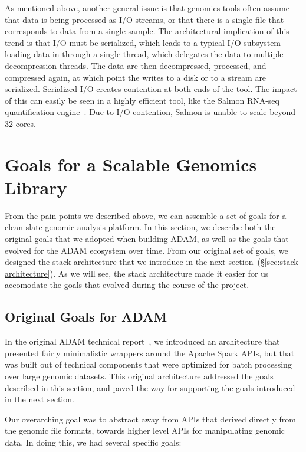 \documentclass[phd]{ucbthesis}
\begin{document}
As mentioned above, another general issue is that genomics tools often assume
that data is being processed as I/O streams, or that there is a single file that
corresponds to data from a single sample. The architectural implication of this
trend is that I/O must be serialized, which leads to a typical I/O subsystem
loading data in through a single thread, which delegates the data to multiple
decompression threads. The data are then decompressed, processed, and compressed
again, at which point the writes to a disk or to a stream are serialized.
Serialized I/O creates contention at both ends of the tool. The impact of this can easily be
seen in a highly efficient tool, like the {Salmon} RNA-seq quantification
engine~\cite{patro17}. Due to I/O contention, {Salmon} is unable to scale
beyond 32 cores.

\section{Goals for a Scalable Genomics Library}
\label{sec:goals}

From the pain points we described above, we can assemble a set of goals for a
clean slate genomic analysis platform. In this section, we describe both the
original goals that we adopted when building {ADAM}, as well as the goals
that evolved for the {ADAM} ecosystem over time. From our original set
of goals, we designed the stack architecture that we introduce in the next
section~(\S\ref{sec:stack-architecture}). As we will see, the stack architecture
made it easier for us accomodate the goals that evolved during the course of
the project.

\subsection{Original Goals for {ADAM}}
\label{sec:original-goals}

In the original {ADAM} technical report~\cite{massie13}, we introduced an
architecture that presented fairly minimalistic wrappers around the
{Apache Spark} APIs, but that was built out of technical components that
were optimized for batch processing over large genomic datasets. This original
architecture addressed the goals described in this section, and paved the way
for supporting the goals introduced in the next section.

Our overarching goal was to abstract away from APIs that derived directly from
the genomic file formats, towards higher level APIs for manipulating genomic
data. In doing this, we had several specific goals:
\end{document}
